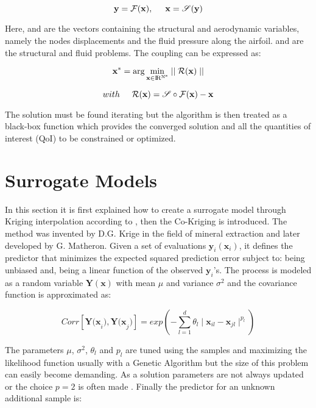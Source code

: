 \documentclass[10pt,twocolumn,a4paper]{scrartcl}
\begin{document}
\begin{equation*}
    \mathbf{y} = \mathcal{F} (\mathbf{x}), \hspace{0.5 cm} \mathbf{x} = \mathscr{S} (\mathbf{y})
\end{equation*}


\noindent Here,  and  are the vectors containing the structural and aerodynamic variables, namely the nodes displacements and the fluid pressure along the airfoil.  and  are the structural and fluid problems. The coupling can be expressed as:

\begin{equation*}
    \mathbf{x}^* = \arg \min_{\mathbf{x} \in \rm I\!R ^{N^{s}}} \mid \mid \mathcal{R} (\mathbf{x}) \mid \mid
\end{equation*}

\begin{equation*}
  with \hspace{0.5 cm} \mathcal{R}(\mathbf{x}) = \mathscr{S} \circ \mathcal{F} (\mathbf{x}) - \mathbf{x}
\end{equation*}

\noindent The solution must be found iterating but the algorithm is then treated as a black-box function which provides the converged solution and all the quantities of interest (QoI) to be constrained or optimized.

\section{Surrogate Models}\label{3}
In this section it is first explained how to create a surrogate model through Kriging interpolation according to \cite{Jones2001}, then the Co-Kriging is introduced. The method was invented by D.G. Krige in the field of mineral extraction and later developed by G. Matheron. Given a set of evaluations $\mathbf{y}_i(\mathbf{x}_i)$, it defines the predictor that minimizes the expected squared prediction error subject to: being unbiased and, being a linear function of the observed $\mathbf{y}_i$’s. The process is modeled as a random variable $\mathbf{Y(x)}$ with mean $\mu$ and variance $\sigma^2$ and the covariance function is approximated as:

\begin{equation*}
Corr[\mathbf{Y(x}_i),\mathbf{Y(x}_j)] = exp(-\sum_{l=1}^{d}\theta_l \mid \mathbf{x}_{il}-\mathbf{x}_{jl} \mid^{p_l})
\end{equation*}

\noindent The parameters $\mu$, $\sigma^2$, $\theta_l$ and $p_l$ are tuned using the samples and maximizing the likelihood function usually with a Genetic Algorithm but the size of this problem can easily become demanding. As a solution parameters are not always updated or the choice $p = 2$ is often made \cite{}. Finally the predictor for an unknown additional sample is:
\end{document}
